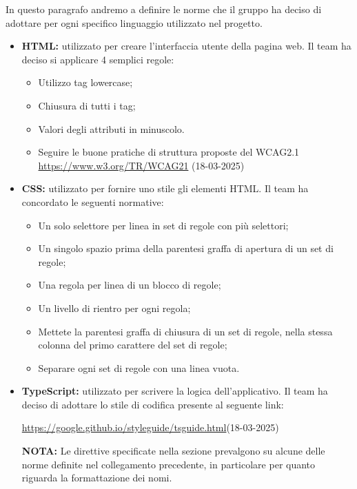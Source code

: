 In questo paragrafo andremo a definire le norme che il gruppo ha deciso di adottare per ogni specifico
linguaggio utilizzato nel progetto.
\begin{itemize}
    \item \textbf{HTML:} utilizzato per creare l'interfaccia utente della pagina web. Il team ha deciso si applicare 4 semplici regole:
    \begin{itemize}
        \item Utilizzo tag lowercase;
        \item Chiusura di tutti i tag;
        \item Valori degli attributi in minuscolo.
        \item Seguire le buone pratiche di struttura proposte del WCAG2.1 \url{https://www.w3.org/TR/WCAG21} (18-03-2025)
    \end{itemize}
    \item \textbf{CSS:} utilizzato per fornire uno stile gli elementi HTML. Il team ha concordato le seguenti normative:
    \begin{itemize}
        \item Un solo selettore per linea in set di regole con più selettori;
        \item Un singolo spazio prima della parentesi graffa di apertura di un set di regole;
        \item Una regola per linea di un blocco di regole;
        \item Un livello di rientro per ogni regola;
        \item Mettete la parentesi graffa di chiusura di un set di regole, nella stessa colonna del primo carattere
        del set di regole;
        \item Separare ogni set di regole con una linea vuota.
    \end{itemize}
    \item \textbf{TypeScript:} utilizzato per scrivere la logica dell'applicativo. 
    Il team ha deciso di adottare lo stile di codifica presente al seguente link:
    \begin{center}
        \url{https://google.github.io/styleguide/tsguide.html}(18-03-2025)
    \end{center}
    \textbf{NOTA:}
    Le direttive specificate nella sezione  prevalgono su alcune delle norme definite nel collegamento precedente,
    in particolare per quanto riguarda la formattazione dei nomi.
\end{itemize}

